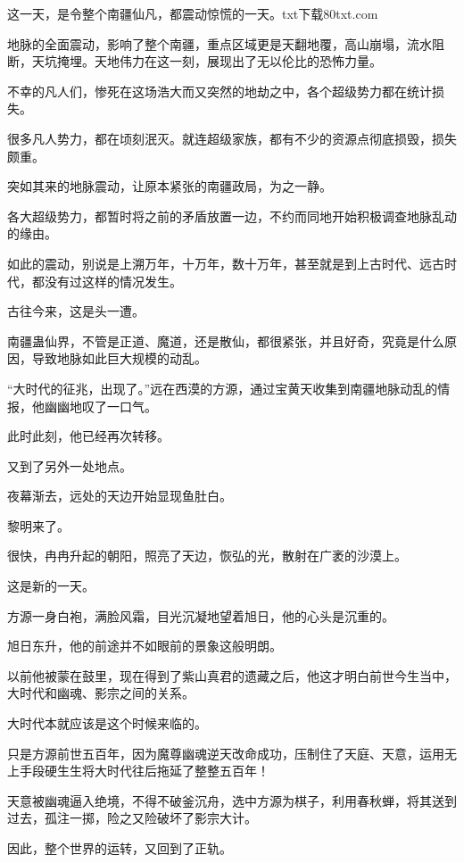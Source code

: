 
\begin{this_body}

这一天，是令整个南疆仙凡，都震动惊慌的一天。txt下载80txt.com

地脉的全面震动，影响了整个南疆，重点区域更是天翻地覆，高山崩塌，流水阻断，天坑掩埋。天地伟力在这一刻，展现出了无以伦比的恐怖力量。

不幸的凡人们，惨死在这场浩大而又突然的地劫之中，各个超级势力都在统计损失。

很多凡人势力，都在顷刻泯灭。就连超级家族，都有不少的资源点彻底损毁，损失颇重。

突如其来的地脉震动，让原本紧张的南疆政局，为之一静。

各大超级势力，都暂时将之前的矛盾放置一边，不约而同地开始积极调查地脉乱动的缘由。

如此的震动，别说是上溯万年，十万年，数十万年，甚至就是到上古时代、远古时代，都没有过这样的情况发生。

古往今来，这是头一遭。

南疆蛊仙界，不管是正道、魔道，还是散仙，都很紧张，并且好奇，究竟是什么原因，导致地脉如此巨大规模的动乱。

“大时代的征兆，出现了。”远在西漠的方源，通过宝黄天收集到南疆地脉动乱的情报，他幽幽地叹了一口气。

此时此刻，他已经再次转移。

又到了另外一处地点。

夜幕渐去，远处的天边开始显现鱼肚白。

黎明来了。

很快，冉冉升起的朝阳，照亮了天边，恢弘的光，散射在广袤的沙漠上。

这是新的一天。

方源一身白袍，满脸风霜，目光沉凝地望着旭日，他的心头是沉重的。

旭日东升，他的前途并不如眼前的景象这般明朗。

以前他被蒙在鼓里，现在得到了紫山真君的遗藏之后，他这才明白前世今生当中，大时代和幽魂、影宗之间的关系。

大时代本就应该是这个时候来临的。

只是方源前世五百年，因为魔尊幽魂逆天改命成功，压制住了天庭、天意，运用无上手段硬生生将大时代往后拖延了整整五百年！

天意被幽魂逼入绝境，不得不破釜沉舟，选中方源为棋子，利用春秋蝉，将其送到过去，孤注一掷，险之又险破坏了影宗大计。

因此，整个世界的运转，又回到了正轨。


\end{this_body}

